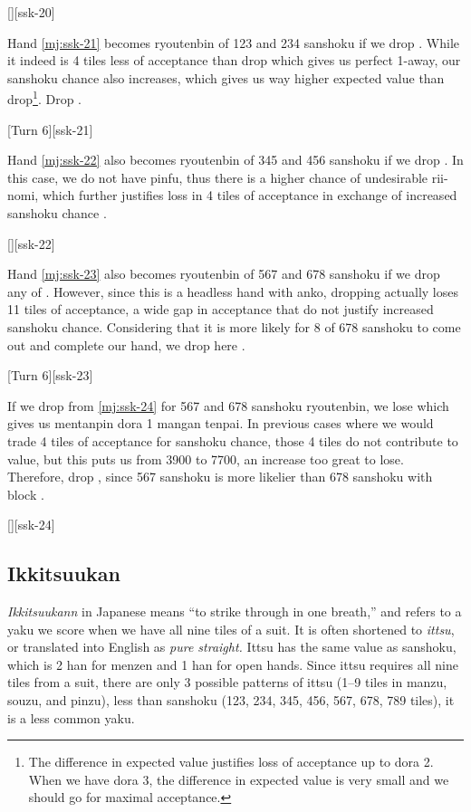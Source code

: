 \documentclass[12pt]{article}
\begin{document}
[][ssk-20]

Hand \ref{mj:ssk-21} becomes ryoutenbin of 123 and 234 sanshoku if we drop . While it indeed is 4 tiles less of acceptance than  drop which gives us perfect 1-away, our sanshoku chance also increases, which gives us way higher expected value than  drop\footnote{The difference in expected value justifies loss of acceptance up to dora 2. When we have dora 3, the difference in expected value is very small and we should go for maximal acceptance.}. Drop  \citep{clearrain-ssk}.

[Turn 6][ssk-21]

Hand \ref{mj:ssk-22} also becomes ryoutenbin of 345 and 456 sanshoku if we drop . In this case, we do not have pinfu, thus there is a higher chance of undesirable rii-nomi, which further justifies loss in 4 tiles of acceptance in exchange of increased sanshoku chance \citep{gendai-ssk}.

[][ssk-22]

Hand \ref{mj:ssk-23} also becomes ryoutenbin of 567 and 678 sanshoku if we drop any of . However, since this is a headless hand with anko, dropping  actually loses 11 tiles of acceptance, a wide gap in acceptance that do not justify increased sanshoku chance. Considering that it is more likely for 8 of 678 sanshoku to come out and complete our hand, we drop  here \citep{clearrain-ssk}.

[Turn 6][ssk-23]

If we drop  from \ref{mj:ssk-24} for 567 and 678 sanshoku ryoutenbin, we lose  which gives us mentanpin dora 1 mangan tenpai. In previous cases where we would trade 4 tiles of acceptance for sanshoku chance, those 4 tiles do not contribute to value, but this  puts us from 3900 to 7700, an increase too great to lose. Therefore, drop , since 567 sanshoku is more likelier than 678 sanshoku with  block \citep{gendai-ssk}.

[][ssk-24]


\subsection{Ikkitsuukan}

\textit{Ikkitsuukann} in Japanese means ``to strike through in one breath,'' and refers to a yaku we score when we have all nine tiles of a suit. It is often shortened to \textit{ittsu}, or translated into English as \textit{pure straight.} Ittsu has the same value as sanshoku, which is 2 han for menzen and 1 han for open hands. Since ittsu requires all nine tiles from a suit, there are only 3 possible patterns of ittsu (1--9 tiles in manzu, souzu, and pinzu), less than sanshoku (123, 234, 345, 456, 567, 678, 789 tiles), it is a less common yaku.
\end{document}
